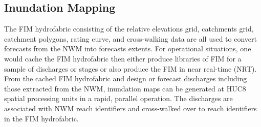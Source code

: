 \documentclass[draft]{dependencies/agujournal2019}
\begin{document}
\subsection{Inundation Mapping}
\label{ssec:inundation_mapping}
%
The FIM hydrofabric consisting of the relative elevations grid, catchments grid, catchment polygons, rating curve, and cross-walking data are all used to convert forecasts from the NWM into forecasts extents.
For operational situations, one would cache the FIM hydrofabric then either produce libraries of FIM for a sample of discharges or stages or also produce the FIM in near real-time (NRT).
From the cached FIM hydrofabric and design or forecast discharges including those extracted from the NWM, inundation maps can be generated at HUC8 spatial processing units in a rapid, parallel operation. 
The discharges are associated with NWM reach identifiers and cross-walked over to reach identifiers in the FIM hydrofabric.
\end{document}

